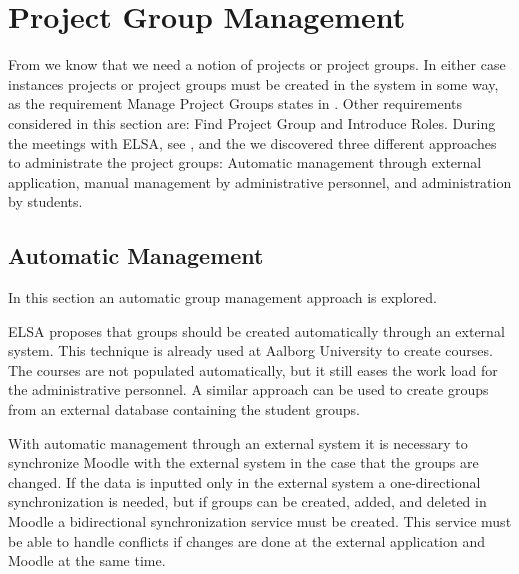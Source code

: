 \section{Project Group Management}
\label{sec:groupManagement}
\label{sec:projectgroupadministration}
From  we know that we need a notion of projects or project groups.
In either case instances projects or project groups must be created in the system in some way, as the requirement Manage Project Groups states in .
Other requirements considered in this section are: Find Project Group and Introduce Roles.
During the meetings with ELSA,  see , and the \admpers{} we discovered three different approaches to administrate the project groups: Automatic management through external application, manual management by administrative personnel, and administration by students. 




\subsection{Automatic Management}
\label{sub:automanagement}
In this section an automatic group management approach is explored.  

ELSA proposes that groups should be created automatically through an external system. 
This technique is already used at Aalborg University to create courses. 
The courses are not populated automatically, but it still eases the work load for the administrative personnel.  
A similar approach can be used to create groups from an external database containing the student groups. 

With automatic management through an external system it is necessary to synchronize Moodle with the external system in the case that the groups are changed. 
If the data is inputted only in the external system a one-directional synchronization is needed, but if groups can be created, added, and deleted in Moodle a bidirectional synchronization service must be created. 
This service must be able to handle conflicts if changes are done at the external application and Moodle at the same time.

